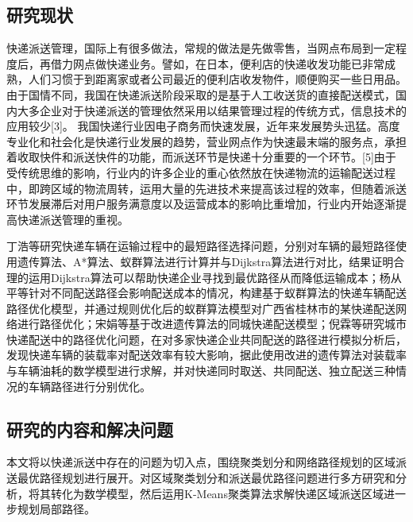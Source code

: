 \subsection{研究现状}
\par 快递派送管理，国际上有很多做法，常规的做法是先做零售，当网点布局到一定程度后，再借力网点做快递业务。譬如，在日本，便利店的快递收发功能已非常成熟，人们习惯于到距离家或者公司最近的便利店收发物件，顺便购买一些日用品。由于国情不同，我国在快递派送阶段采取的是基于人工收送货的直接配送模式，国内大多企业对于快递派送的管理依然采用以结果管理过程的传统方式，信息技术的应用较少[3]。 \cite{einstein}
我国快递行业因电子商务而快速发展，近年来发展势头迅猛。高度专业化和社会化是快递行业发展的趋势，营业网点作为快速最末端的服务点，承担着收取快件和派送快件的功能，而派送环节是快递十分重要的一个环节。[5]由于受传统思维的影响，行业内的许多企业的重心依然放在快递物流的运输配送过程中，即跨区域的物流周转，运用大量的先进技术来提高该过程的效率，但随着派送环节发展滞后对用户服务满意度以及运营成本的影响比重增加，行业内开始逐渐提高快递派送管理的重视。
\par 丁浩等研究快递车辆在运输过程中的最短路径选择问题，分别对车辆的最短路径使用遗传算法、A*算法、蚁群算法进行计算并与Dijkstra算法进行对比，结果证明合理的运用Dijkstra算法可以帮助快递企业寻找到最优路径从而降低运输成本；杨从平等针对不同配送路径会影响配送成本的情况，构建基于蚁群算法的快递车辆配送路径优化模型，并通过规则优化后的蚁群算法模型对广西省桂林市的某快递配送网络进行路径优化；宋娟等基于改进遗传算法的同城快递配送模型；倪霖等研究城市快递配送中的路径优化问题，在对多家快递企业共同配送的路径进行模拟分析后，发现快递车辆的装载率对配送效率有较大影响，据此使用改进的遗传算法对装载率与车辆油耗的数学模型进行求解，并对快递同时取送、共同配送、独立配送三种情况的车辆路径进行分别优化。

\subsection{研究的内容和解决问题}
\par 本文将以快递派送中存在的问题为切入点，围绕聚类划分和网络路径规划的区域派送最优路径规划进行展开。对区域聚类划分和派送最优路径问题进行多方研究和分析，将其转化为数学模型，然后运用K-Means聚类算法求解快递区域派送区域进一步规划局部路径。

